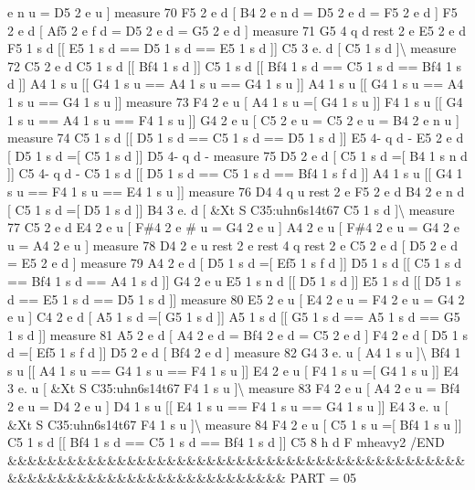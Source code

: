 e n u = D5 2 e u \mbox{]} measure 70 F5 2 e d \mbox{[} B4 2 e n d = D5 2 e d = F5 2 e d \mbox{]} F5 2 e d \mbox{[} Af5 2 e f d = D5 2 e d = G5 2 e d \mbox{]} measure 71 G5 4 q d rest 2 e E5 2 e d F5 1 s d \mbox{[}\mbox{[} E5 1 s d == D5 1 s d == E5 1 s d \mbox{]}\mbox{]} C5 3 e. d \mbox{[} C5 1 s d \mbox{]}\textbackslash{} measure 72 C5 2 e d C5 1 s d \mbox{[}\mbox{[} Bf4 1 s d \mbox{]}\mbox{]} C5 1 s d \mbox{[}\mbox{[} Bf4 1 s d == C5 1 s d == Bf4 1 s d \mbox{]}\mbox{]} A4 1 s u \mbox{[}\mbox{[} G4 1 s u == A4 1 s u == G4 1 s u \mbox{]}\mbox{]} A4 1 s u \mbox{[}\mbox{[} G4 1 s u == A4 1 s u == G4 1 s u \mbox{]}\mbox{]} measure 73 F4 2 e u \mbox{[} A4 1 s u =\mbox{[} G4 1 s u \mbox{]}\mbox{]} F4 1 s u \mbox{[}\mbox{[} G4 1 s u == A4 1 s u == F4 1 s u \mbox{]}\mbox{]} G4 2 e u \mbox{[} C5 2 e u = C5 2 e u = B4 2 e n u \mbox{]} measure 74 C5 1 s d \mbox{[}\mbox{[} D5 1 s d == C5 1 s d == D5 1 s d \mbox{]}\mbox{]} E5 4-\/ q d -\/ E5 2 e d \mbox{[} D5 1 s d =\mbox{[} C5 1 s d \mbox{]}\mbox{]} D5 4-\/ q d -\/ measure 75 D5 2 e d \mbox{[} C5 1 s d =\mbox{[} B4 1 s n d \mbox{]}\mbox{]} C5 4-\/ q d -\/ C5 1 s d \mbox{[}\mbox{[} D5 1 s d == C5 1 s d == Bf4 1 s f d \mbox{]}\mbox{]} A4 1 s u \mbox{[}\mbox{[} G4 1 s u == F4 1 s u == E4 1 s u \mbox{]}\mbox{]} measure 76 D4 4 q u rest 2 e F5 2 e d B4 2 e n d \mbox{[} C5 1 s d =\mbox{[} D5 1 s d \mbox{]}\mbox{]} B4 3 e. d \mbox{[} \&Xt S C35\+:uhn6s14t67 C5 1 s d \mbox{]}\textbackslash{} measure 77 C5 2 e d E4 2 e u \mbox{[} F\#4 2 e \# u = G4 2 e u \mbox{]} A4 2 e u \mbox{[} F\#4 2 e u = G4 2 e u = A4 2 e u \mbox{]} measure 78 D4 2 e u rest 2 e rest 4 q rest 2 e C5 2 e d \mbox{[} D5 2 e d = E5 2 e d \mbox{]} measure 79 A4 2 e d \mbox{[} D5 1 s d =\mbox{[} Ef5 1 s f d \mbox{]}\mbox{]} D5 1 s d \mbox{[}\mbox{[} C5 1 s d == Bf4 1 s d == A4 1 s d \mbox{]}\mbox{]} G4 2 e u E5 1 s n d \mbox{[}\mbox{[} D5 1 s d \mbox{]}\mbox{]} E5 1 s d \mbox{[}\mbox{[} D5 1 s d == E5 1 s d == D5 1 s d \mbox{]}\mbox{]} measure 80 E5 2 e u \mbox{[} E4 2 e u = F4 2 e u = G4 2 e u \mbox{]} C4 2 e d \mbox{[} A5 1 s d =\mbox{[} G5 1 s d \mbox{]}\mbox{]} A5 1 s d \mbox{[}\mbox{[} G5 1 s d == A5 1 s d == G5 1 s d \mbox{]}\mbox{]} measure 81 A5 2 e d \mbox{[} A4 2 e d = Bf4 2 e d = C5 2 e d \mbox{]} F4 2 e d \mbox{[} D5 1 s d =\mbox{[} Ef5 1 s f d \mbox{]}\mbox{]} D5 2 e d \mbox{[} Bf4 2 e d \mbox{]} measure 82 G4 3 e. u \mbox{[} A4 1 s u \mbox{]}\textbackslash{} Bf4 1 s u \mbox{[}\mbox{[} A4 1 s u == G4 1 s u == F4 1 s u \mbox{]}\mbox{]} E4 2 e u \mbox{[} F4 1 s u =\mbox{[} G4 1 s u \mbox{]}\mbox{]} E4 3 e. u \mbox{[} \&Xt S C35\+:uhn6s14t67 F4 1 s u \mbox{]}\textbackslash{} measure 83 F4 2 e u \mbox{[} A4 2 e u = Bf4 2 e u = D4 2 e u \mbox{]} D4 1 s u \mbox{[}\mbox{[} E4 1 s u == F4 1 s u == G4 1 s u \mbox{]}\mbox{]} E4 3 e. u \mbox{[} \&Xt S C35\+:uhn6s14t67 F4 1 s u \mbox{]}\textbackslash{} measure 84 F4 2 e u \mbox{[} C5 1 s u =\mbox{[} Bf4 1 s u \mbox{]}\mbox{]} C5 1 s d \mbox{[}\mbox{[} Bf4 1 s d == C5 1 s d == Bf4 1 s d \mbox{]}\mbox{]} C5 8 h d F mheavy2 /\+E\+ND \&\&\&\&\&\&\&\&\&\&\&\&\&\&\&\&\&\&\&\&\&\&\&\&\&\&\&\&\&\&\&\&\&\&\&\&\&\&\&\&\&\&\&\&\&\&\&\&\&\&\&\&\&\&\&\&\&\&\&\&\&\&\&\&\&\&\&\&\&\&\&\&\&\& P\+A\+RT = 05 